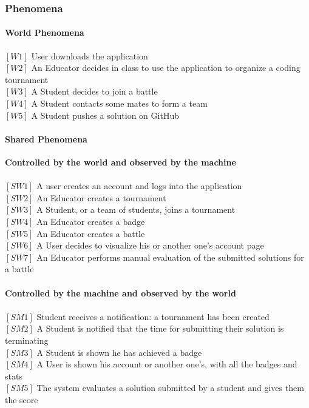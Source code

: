 \documentclass{article}
\begin{document}
      \subsubsection{Phenomena}
        {\setlength{\leftskip}{2em}
            \paragraph{World Phenomena}
            $[W1]$ User downloads the application\\
            $[W2]$ An Educator decides in class to use the application to organize a coding tournament\\
            $[W3]$ A Student decides to join a battle\\
            $[W4]$ A Student contacts some mates to form a team\\
            $[W5]$ A Student pushes a solution on GitHub\\

            \paragraph{Shared Phenomena}
            \textbf{Controlled by the world and observed by the machine} \\\\
            $[SW1]$ A user creates an account and logs into the application\\
            $[SW2]$ An Educator creates a tournament\\
            $[SW3]$ A Student, or a team of students, joins a tournament\\
            $[SW4]$ An Educator creates a badge\\
            $[SW5]$ An Educator creates a battle\\
            $[SW6]$ A User decides to visualize his or another one's account page\\
            $[SW7]$ An Educator performs manual evaluation of the submitted solutions for a battle
\\\\
            \textbf{Controlled by the machine and observed by the world}\\\\
            $[SM1]$ Student receives a notification: a tournament has been created \\
            $[SM2]$ A Student is notified that the time for submitting their solution is terminating\\
            $[SM3]$ A Student is shown he has achieved a badge\\
            $[SM4]$ A User is shown his account or another one's, with all the badges and stats\\
            $[SM5]$ The system evaluates a solution submitted by a student and gives them the score
            }
\end{document}
